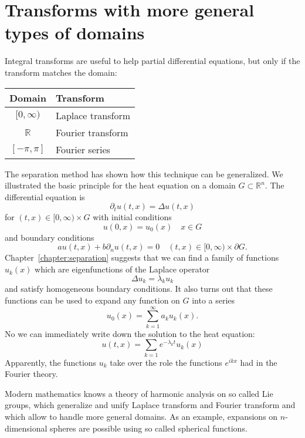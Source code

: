 %
%
%
\section{Transforms with more general types of domains}
Integral transforms are useful to help partial differential equations,
but only if the transform matches the domain:
\begin{center}
\begin{tabular}{cl}
Domain&Transform\\
\hline
$[0,\infty)$&Laplace transform\\
$\mathbb R$&Fourier transform\\
$[-\pi,\pi]$&Fourier series
\end{tabular}
\end{center}
The separation method has shown how this technique can be generalized.
We illustrated the basic principle for the heat equation on a domain
$G\subset \mathbb R^n$.
The differential equation is
\[
\partial_t u(t,x)=\Delta u(t,x)
\]
for $(t,x)\in [0,\infty)\times G$ with initial conditions
\[
u(0,x)=u_0(x) \quad x\in G
\]
and boundary conditions
\[
au(t,x)+b\partial_nu(t,x)=0\quad (t,x)\in[0,\infty)\times \partial G.
\]
Chapter~\ref{chapter:separation} suggests that we can find a family
of functions
$u_k(x)$ which are eigenfunctions of the Laplace operator
\[
\Delta u_k=\lambda_k u_k
\]
and satisfy homogeneous boundary conditions.
It also turns out that these functions can be used to expand any
function on $G$ into a series
\[
u_0(x)=\sum_{k=1}^\infty a_ku_k(x).
\]
No we can immediately write down the solution to the heat equation:
\[
u(t,x)=\sum_{k=1}e^{-\lambda_kt}u_k(x)
\]
Apparently, the functions $u_k$ take over the role the functions
$e^{ikx}$ had in the Fourier theory.

Modern mathematics knows a theory of harmonic analysis on so called
Lie groups, which generalize and unify Laplace transform and Fourier
transform and which allow to handle more general domains.
As an example, expansions on $n$-dimensional spheres are possible
using so called spherical functions.

